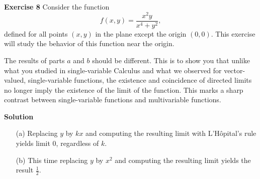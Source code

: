 \documentclass[12pt,oneside]{exam}
\newenvironment{exercise}[1]{\vspace{.1in}\noindent\textbf{Exercise #1 \hspace{.05em}}}{}
\newenvironment{newsolution}{\vspace{.1in}\noindent\textbf{Solution \hspace{.05em}}}{}
\begin{document}
\begin{exercise}{8}
Consider the function 
\begin{equation*}
f(x,y)=\frac{x^2y}{x^4+y^2},
\end{equation*}
defined for all points $(x,y)$ in the plane except the origin $(0,0)$. This exercise will study the behavior of this function near the origin. 


The results of parts $a$ and $b$ should be different. This is to show you that unlike what you studied in single-variable Calculus and what we observed for vector-valued, single-variable functions, the existence and coincidence of directed limits no longer imply the existence of the limit of the function. This marks a sharp contrast between single-variable functions and multivariable functions.
\end{exercise}

\begin{newsolution}
\begin{itemize}
\item[(a)] Replacing $y$ by $kx$ and computing the resulting limit with L'H\^opital's rule yields limit $0$, regardless of $k$. 
\item[(b)] This time replacing $y$ by $x^2$ and computing the resulting limit yields the result $\frac{1}{2}$. 
\end{itemize}
\end{newsolution}
\end{document}
